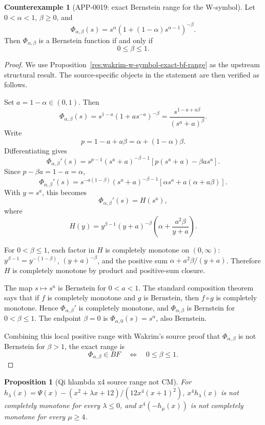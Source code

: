 \documentclass[11pt]{article}
\numberwithin{equation}{section}
\newtheorem{proposition}[theorem]{Proposition}
\theoremstyle{definition}
\newtheorem{counterexample}[theorem]{Counterexample}
\theoremstyle{remark}
\newcommand{\1}{\mathbf 1}
\begin{document}
\begin{counterexample}[APP-0019: exact Bernstein range for the W-symbol]
\label{thm:app19-w-symbol}
Let \(0<\alpha<1\), \(\beta\ge0\), and
\[
  \Phi_{\alpha,\beta}(s)
     =s^\alpha\left(1+(1-\alpha)s^{\alpha-1}\right)^{-\beta}.
\]
Then \(\Phi_{\alpha,\beta}\) is a Bernstein function if and only if
\[
  0\le \beta\le 1 .
\]


\end{counterexample}

\begin{proof}
We use Proposition~\ref{res:wakrim-w-symbol-exact-bf-range} as the upstream structural result. The source-specific objects in the statement are then verified as follows.

Set \(a=1-\alpha\in(0,1)\). Then
\[
\Phi_{\alpha,\beta}(s)
=s^{1-a}\left(1+a s^{-a}\right)^{-\beta}
=\frac{s^{1-a+a\beta}}{(s^a+a)^\beta}.
\]
Write
\[
p=1-a+a\beta=\alpha+(1-\alpha)\beta.
\]
Differentiating gives
\[
\Phi_{\alpha,\beta}'(s)
=s^{p-1}(s^a+a)^{-\beta-1}
\left[p(s^a+a)-\beta a s^a\right].
\]
Since \(p-\beta a=1-a=\alpha\),
\[
\Phi_{\alpha,\beta}'(s)
=s^{-a(1-\beta)}(s^a+a)^{-\beta-1}
\left[\alpha s^a+a(\alpha+a\beta)\right].
\]
With \(y=s^a\), this becomes
\[
\Phi_{\alpha,\beta}'(s)=H(s^a),
\]
where
\[
H(y)=
y^{\beta-1}(y+a)^{-\beta}
\left(\alpha+\frac{a^2\beta}{y+a}\right).
\]

For \(0<\beta\le1\), each factor in \(H\) is completely monotone on \((0,\infty)\): \(y^{\beta-1}=y^{-(1-\beta)}\), \((y+a)^{-\beta}\), and the positive sum \(\alpha+a^2\beta/(y+a)\). Therefore \(H\) is completely monotone by product and positive-sum closure.

The map \(s\mapsto s^a\) is Bernstein for \(0<a<1\). The standard composition theorem says that if \(f\) is completely monotone and \(g\) is Bernstein, then \(f\circ g\) is completely monotone. Hence \(\Phi_{\alpha,\beta}'\) is completely monotone, and \(\Phi_{\alpha,\beta}\) is Bernstein for \(0<\beta\le1\). The endpoint \(\beta=0\) is \(\Phi_{\alpha,0}(s)=s^\alpha\), also Bernstein.

Combining this local positive range with Wakrim's source proof that \(\Phi_{\alpha,\beta}\) is not Bernstein for \(\beta>1\), the exact range is
\[
\Phi_{\alpha,\beta}\in BF
\quad\Longleftrightarrow\quad
0\le\beta\le1.
\]
\end{proof}

\begin{proposition}[Qi hlambda x4 source range not CM]
\label{res:qi-hlambda-x4-source-range-not-cm}
For \(h_\lambda(x)=\Psi(x)-(x^2+\lambda x+12)/(12x^4(x+1)^2)\), \(x^4h_\lambda(x)\) is not completely monotone for every \(\lambda\le0\), and \(x^4(-h_\mu(x))\) is not completely monotone for every \(\mu\ge4\).
\end{proposition}
\end{document}
